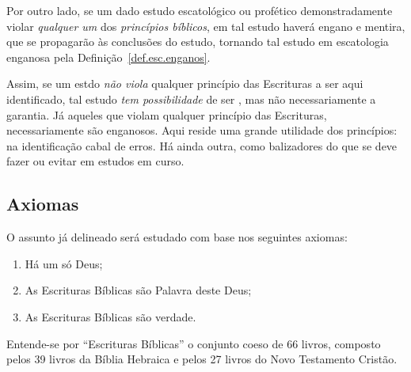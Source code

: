     Por outro lado, se um dado estudo escatológico ou profético demonstradamente violar \emph{qualquer um} dos  \emph{princípios
    bíblicos}, em tal estudo haverá engano e mentira, que se  propagarão  às  conclusões  do  estudo,  tornando  tal  estudo  em
    escatologia enganosa pela Definição~\ref{def.esc.enganos}.

    Assim, se um estdo \emph{não viola} qualquer princípio  das  Escrituras  a  ser  aqui  identificado,  tal  estudo  \emph{tem
    possibilidade} de ser , mas não necessariamente a garantia. Já aqueles que  violam  qualquer  princípio
    das Escrituras, necessariamente são enganosos. Aqui reside uma grande utilidade dos princípios: na  identificação  cabal  de
    erros. Há ainda outra, como balizadores do que se deve fazer ou evitar em estudos em curso.


    \subsection{Axiomas}

    O assunto já delineado será estudado com base nos seguintes axiomas:

    \begin{enumerate}

        \item\label{ax:Deus.exis} Há um só Deus;

        \item\label{ax:Escr.pala} As Escrituras Bíblicas são Palavra deste Deus;

        \item\label{ax:Deus.verd} As Escrituras Bíblicas são verdade.

    \end{enumerate}

    Entende-se por ``Escrituras Bíblicas'' o conjunto coeso de 66 livros, composto pelos 39 livros da Bíblia Hebraica e pelos 27
    livros do Novo Testamento Cristão.


